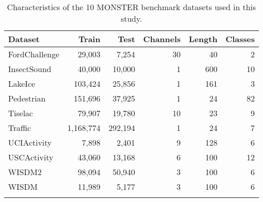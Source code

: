 \begin{table}[t]
\caption{Characteristics of the 10 MONSTER benchmark datasets used in this study.}\label{tab:dataset_characteristics}
\centering
\begin{tabular}{lrrrrr}
\toprule
Dataset & Train & Test & Channels & Length & Classes \\
\midrule
FordChallenge        & 29,003 & 7,254 & 30 & 40 & 2 \\
InsectSound          & 40,000 & 10,000 & 1 & 600 & 10 \\
LakeIce              & 103,424 & 25,856 & 1 & 161 & 3 \\
Pedestrian           & 151,696 & 37,925 & 1 & 24 & 82 \\
Tiselac              & 79,907 & 19,780 & 10 & 23 & 9 \\
Traffic              & 1,168,774 & 292,194 & 1 & 24 & 7 \\
UCIActivity          & 7,898 & 2,401 & 9 & 128 & 6 \\
USCActivity          & 43,060 & 13,168 & 6 & 100 & 12 \\
WISDM2               & 98,094 & 50,940 & 3 & 100 & 6 \\
WISDM                & 11,989 & 5,177 & 3 & 100 & 6 \\
\botrule
\end{tabular}
\end{table}